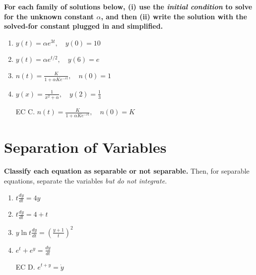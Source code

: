 \documentclass[11pt,onecolumn,superscriptaddress,notitlepage]{article}
\newcommand{\dy}[0]{\displaystyle\frac{dy}{dt}}
\begin{document}
{\bf For each family of solutions below, (i) use the {\it initial condition} to solve for the unknown constant $\alpha$, and then (ii) write the solution with the solved-for constant plugged in and simplified.}

\begin{enumerate}[resume,itemsep=90pt]
	\item $y(t) = \alpha e^{3t}, \quad y(0) = 10 $
	\item $y(t) = \alpha e^{t/2}, \quad y(6) = e $
	\item $\displaystyle n(t) = \frac{K}{1+\alpha Ke^{-r t}}, \quad n(0) = 1$
	\item $\displaystyle y(x) = \frac{1}{x^2 + \alpha}, \quad y(2) = \frac{1}{3}$  
	\item[EC C.] $\displaystyle n(t) = \frac{K}{1+ \alpha Ke^{-r t}}, \quad n(0) = K$
\end{enumerate}


\clearpage
\section*{Separation of Variables}

{\bf Classify each equation as separable or not separable.}  Then, for separable equations, separate the variables {\it but do not integrate.}
\begin{enumerate}[resume,itemsep=90pt]
	\item $t \dy = 4y$
	\item $t \dy = 4+t$
	\item $y \ln t \dy = \left(\frac{y+1}{t}\right)^2$
	\item $e^t + e^y = \dy$
	\item[EC D.] $e^{t+y} = \dot{y}$
\end{enumerate}


\end{document}
